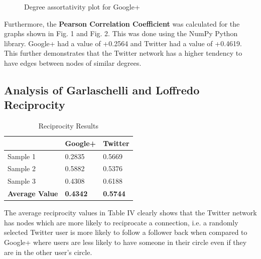 \documentclass[a4paper, 10pt, conference]{ieeeconf}      %
\begin{document}
\begin{figure}[thpb]
      \centering
      \caption{Degree assortativity plot for Google+}
      \label{figurelabel}
   \end{figure}
   
Furthermore, the \textbf{Pearson Correlation Coefficient} was calculated for the graphs shown in Fig. 1 and Fig. 2. This was done using the NumPy Python library. Google+ had a value of +0.2564 and Twitter had a value of +0.4619. This further demonstrates that the Twitter network has a higher tendency to have edges between nodes of similar degrees.

\subsection{Analysis of Garlaschelli and Loffredo Reciprocity}

\begin{table}[htb]
\caption{Reciprocity Results}
\begin{center}
\begin{tabular}{ | l | l | l |} 
\hline
& \textbf{Google+} & \textbf{Twitter}\\[0.5ex]
\hline
Sample 1 & 0.2835 & 0.5669\\
Sample 2 & 0.5882 & 0.5376\\
Sample 3 & 0.4308 & 0.6188\\[0.5ex]
\hline
\textbf{Average Value} & \textbf{0.4342} & \textbf{0.5744}\\[0.5ex]
\hline
\end{tabular}
\end{center}
\end{table}

The average reciprocity values in Table IV clearly shows that the Twitter network has nodes which are more likely to reciprocate a connection, i.e. a randomly selected Twitter user is more likely to follow a follower back when compared to Google+ where users are less likely to have someone in their circle even if they are in the other user’s circle.
\end{document}
